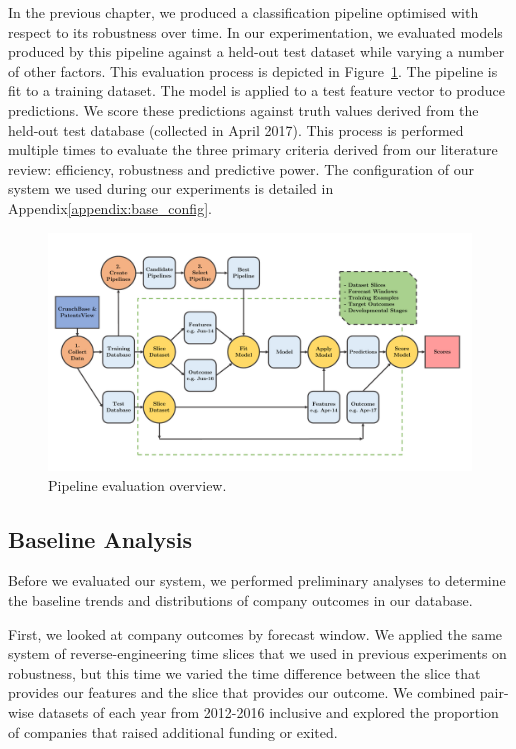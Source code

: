 \documentclass[../thesis/thesis.tex]{subfiles}
\begin{document}
In the previous chapter, we produced a classification pipeline optimised with respect to its robustness over time. In our experimentation, we evaluated models produced by this pipeline against a held-out test dataset while varying a number of other factors. This evaluation process is depicted in Figure~\ref{fig:evaluation:pipeline_evaluation}. The pipeline is fit to a training dataset. The model is applied to a test feature vector to produce predictions. We score these predictions against truth values derived from the held-out test database (collected in April 2017). This process is performed multiple times to evaluate the three primary criteria derived from our literature review: efficiency, robustness and predictive power. The configuration of our system we used during our experiments is detailed in Appendix\ref{appendix:base_config}.

\begin{figure}[!htb]
    \centering
    \includegraphics[width=\textwidth]{../figures/evaluation/flowchart_evaluation}
    \caption[Pipeline evaluation flowchart]{Pipeline evaluation overview.}
    \label{fig:evaluation:pipeline_evaluation}
\end{figure}

\subsection{Baseline Analysis}

Before we evaluated our system, we performed preliminary analyses to determine the baseline trends and distributions of company outcomes in our database.

First, we looked at company outcomes by forecast window. We applied the same system of reverse-engineering time slices that we used in previous experiments on robustness, but this time we varied the time difference between the slice that provides our features and the slice that provides our outcome. We combined pair-wise datasets of each year from 2012-2016 inclusive and explored the proportion of companies that raised additional funding or exited.
\end{document}
